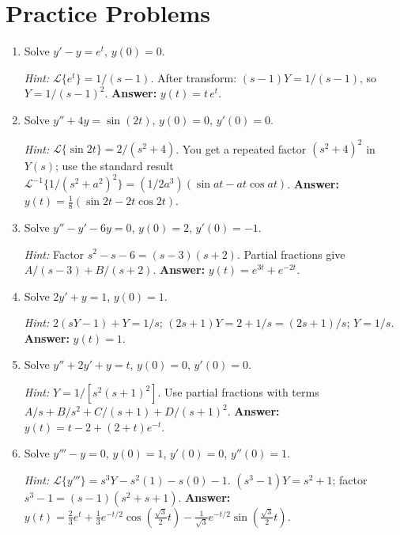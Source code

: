 \documentclass[12pt,a4paper]{article}
\begin{document}
\section{Practice Problems}

\begin{enumerate}

\item Solve $y' - y = e^t$, $y(0) = 0$.

\textit{Hint:} $\mathcal{L}\{e^t\} = 1/(s-1)$. After transform:
$(s-1)Y = 1/(s-1)$, so $Y = 1/(s-1)^2$.
\textbf{Answer:} $y(t) = t\,e^t$.

\item Solve $y'' + 4y = \sin(2t)$, $y(0) = 0$, $y'(0) = 0$.

\textit{Hint:} $\mathcal{L}\{\sin 2t\} = 2/(s^2+4)$. You get a
repeated factor $(s^2+4)^2$ in $Y(s)$; use the standard result
$\mathcal{L}^{-1}\{1/(s^2+a^2)^2\} = (1/2a^3)(\sin at - at\cos at)$.
\textbf{Answer:} $y(t) = \tfrac{1}{8}(\sin 2t - 2t\cos 2t)$.

\item Solve $y'' - y' - 6y = 0$, $y(0) = 2$, $y'(0) = -1$.

\textit{Hint:} Factor $s^2-s-6 = (s-3)(s+2)$. Partial fractions give
$A/(s-3)+B/(s+2)$.
\textbf{Answer:} $y(t) = e^{3t} + e^{-2t}$.

\item Solve $2y' + y = 1$, $y(0) = 1$.

\textit{Hint:} $2(sY-1)+Y = 1/s$; $(2s+1)Y = 2 + 1/s = (2s+1)/s$;
$Y = 1/s$.
\textbf{Answer:} $y(t) = 1$.

\item Solve $y'' + 2y' + y = t$, $y(0) = 0$, $y'(0) = 0$.

\textit{Hint:} $Y = 1/[s^2(s+1)^2]$. Use partial fractions with terms
$A/s + B/s^2 + C/(s+1) + D/(s+1)^2$.
\textbf{Answer:} $y(t) = t - 2 + (2+t)e^{-t}$.

\item Solve $y''' - y = 0$, $y(0) = 1$, $y'(0) = 0$, $y''(0) = 1$.

\textit{Hint:} $\mathcal{L}\{y'''\} = s^3Y - s^2(1) - s(0) - 1$.
$(s^3-1)Y = s^2+1$; factor $s^3-1=(s-1)(s^2+s+1)$.
\textbf{Answer:} $y(t) = \tfrac{2}{3}e^t + \tfrac{1}{3}e^{-t/2}\cos(\tfrac{\sqrt{3}}{2}t) - \tfrac{1}{\sqrt{3}}e^{-t/2}\sin(\tfrac{\sqrt{3}}{2}t)$.

\end{enumerate}
\end{document}
